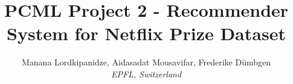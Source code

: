 \documentclass[10pt,conference,compsocconf]{IEEEtran}
\begin{document}
\title{PCML Project 2 - Recommender System for Netflix Prize Dataset}

\author{
  Manana Lordkipanidze,
  Aidasadat Mousavifar, 
  Frederike Dümbgen \\
  \textit{EPFL, Switzerland}
}

\maketitle




% 
% 



\end{document}
